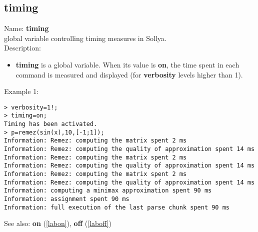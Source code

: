 \subsection{timing}
\label{labtiming}
\noindent Name: \textbf{timing}\\
global variable controlling timing measures in Sollya.\\

\noindent Description: \begin{itemize}

\item \textbf{timing} is a global variable. When its value is \textbf{on}, the time spent in each 
   command is measured and displayed (for \textbf{verbosity} levels higher than 1).
\end{itemize}
\noindent Example 1: 
\begin{center}\begin{minipage}{15cm}\begin{Verbatim}[frame=single]
> verbosity=1!;
> timing=on;
Timing has been activated.
> p=remez(sin(x),10,[-1;1]);
Information: Remez: computing the matrix spent 2 ms
Information: Remez: computing the quality of approximation spent 14 ms
Information: Remez: computing the matrix spent 2 ms
Information: Remez: computing the quality of approximation spent 14 ms
Information: Remez: computing the matrix spent 2 ms
Information: Remez: computing the quality of approximation spent 14 ms
Information: computing a minimax approximation spent 90 ms
Information: assignment spent 90 ms
Information: full execution of the last parse chunk spent 90 ms
\end{Verbatim}
\end{minipage}\end{center}
See also: \textbf{on} (\ref{labon}), \textbf{off} (\ref{laboff})
